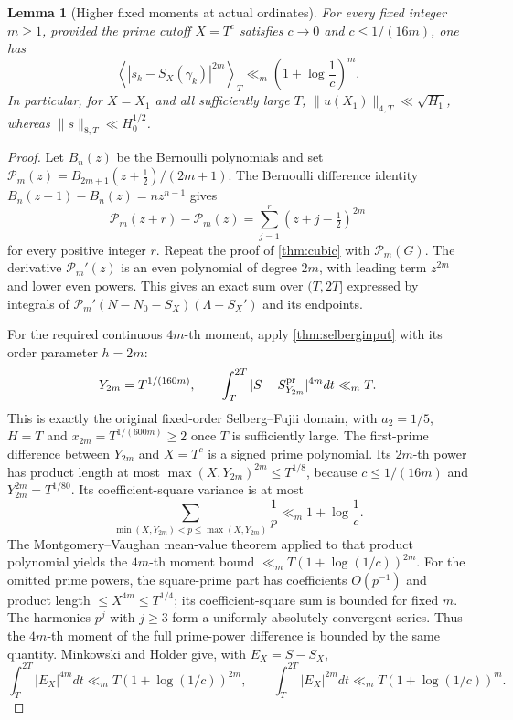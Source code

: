\documentclass[11pt,reqno]{amsart}
\numberwithin{equation}{section}
\newtheorem{lemma}[theorem]{Lemma}
\newcommand{\av}[1]{\left\langle #1\right\rangle_T}
\begin{document}
\begin{lemma}[Higher fixed moments at actual ordinates]\label{lem:higherordinal}
For every fixed integer $m\ge1$, provided the prime cutoff
$X=T^c$ satisfies $c\to0$ and $c\le1/(16m)$, one has
\begin{equation}\label{eq:higherordinal}
\av{|s_k-S_X(\gamma_k)|^{2m}}
 \ll_m\left(1+\log\frac1c\right)^m.
\end{equation}
In particular, for $X=X_1$ and all sufficiently large $T$,
$\|u(X_1)\|_{4,T}\ll\sqrt{H_1}$, whereas
$\|s\|_{8,T}\ll H_0^{1/2}$.
\end{lemma}
\begin{proof}
Let $B_n(z)$ be the Bernoulli polynomials and set
$\mathcal P_m(z)=B_{2m+1}(z+\frac12)/(2m+1)$.
The Bernoulli difference identity
$B_n(z+1)-B_n(z)=nz^{n-1}$ gives
\[
\mathcal P_m(z+r)-\mathcal P_m(z)
 =\sum_{j=1}^r(z+j-\tfrac12)^{2m}
\]
for every positive integer $r$.
Repeat the proof of \cref{thm:cubic} with $\mathcal P_m(G)$.
The derivative $\mathcal P_m'(z)$ is an even polynomial of degree
$2m$, with leading term $z^{2m}$ and lower even powers.
This gives an exact sum over $(T,2T]$ expressed by integrals of
$\mathcal P_m'(N-N_0-S_X)(\Lambda+S_X')$ and its endpoints.

For the required continuous $4m$-th moment, apply
\cref{thm:selberginput} with its order parameter $h=2m$:
\[
Y_{2m}=T^{1/(160m)},\qquad
\int_T^{2T}|S-S_{Y_{2m}}^{\rm pr}|^{4m}dt\ll_m T.
\]
This is exactly the original fixed-order Selberg--Fujii domain,
with $a_2=1/5$, $H=T$ and
$x_{2m}=T^{1/(600m)}\ge2$ once $T$ is sufficiently large.
The first-prime difference between $Y_{2m}$ and $X=T^c$
is a signed prime polynomial. Its $2m$-th power has
product length at most
$\max(X,Y_{2m})^{2m}\le T^{1/8}$,
because $c\le1/(16m)$ and
$Y_{2m}^{2m}=T^{1/80}$. Its coefficient-square
variance is at most
\[
\sum_{\min(X,Y_{2m})<p\le\max(X,Y_{2m})}\frac1p
\ll_m 1+\log\frac1c.
\]
The Montgomery--Vaughan mean-value theorem applied to
that product polynomial yields the $4m$-th moment bound
$\ll_m T(1+\log(1/c))^{2m}$. For the omitted
prime powers, the square-prime part has coefficients $O(p^{-1})$
and product length $\le X^{4m}\le T^{1/4}$;
its coefficient-square sum is bounded for fixed $m$.
The harmonics $p^j$ with $j\ge3$ form a uniformly
absolutely convergent series. Thus the $4m$-th moment
of the full prime-power difference is bounded by the
same quantity. Minkowski and Holder give, with
$E_X=S-S_X$,
\[
\int_T^{2T}|E_X|^{4m}dt\ll_m
 T(1+\log(1/c))^{2m},\qquad\int_T^{2T}|E_X|^{2m}dt\ll_m
 T(1+\log(1/c))^{m}.
\]


\end{proof}
\end{document}
